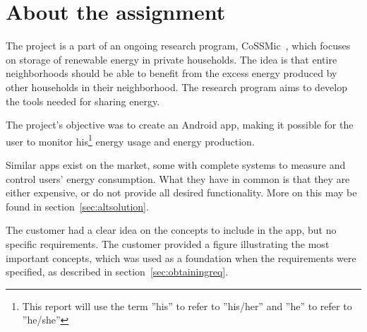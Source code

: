 \section{About the assignment}

The project is a part of an ongoing research program, CoSSMic~\cite{cossmic}, which focuses on storage of renewable energy in private households. 
The idea is that entire neighborhoods should be able to benefit from the excess energy produced by other households in their neighborhood. 
The research program aims to develop the tools needed for sharing energy. 

The project's objective was to create an Android \gls{app}, making it possible for the user to monitor his\footnote{This report will use the term ''his'' to refer to ''his/her'' and ''he'' to refer to ''he/she''} 
energy usage and energy production. 

Similar apps exist on the market, some with complete systems to measure and control users' energy consumption. What they have in common is that they are either expensive, or do not provide all desired functionality. More on this may be found in section~\ref{sec:altsolution}.

The customer had a clear idea on the concepts to include in the app, but no specific requirements. The customer provided a figure illustrating the most important concepts, which was used as a foundation when the requirements were specified,
as described in section~\ref{sec:obtainingreq}.